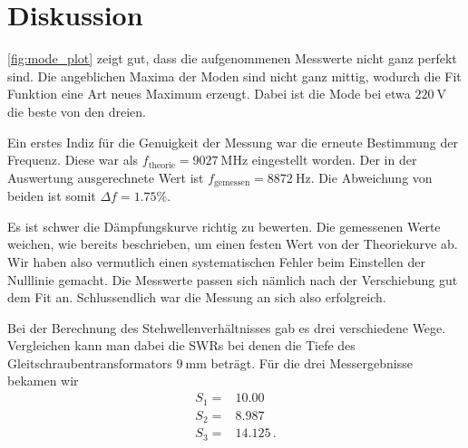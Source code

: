 \section{Diskussion}
\label{sec:Diskussion}

\autoref{fig:mode_plot} zeigt gut, dass die aufgenommenen Messwerte nicht ganz perfekt sind.
Die angeblichen Maxima der Moden sind nicht ganz mittig, wodurch die Fit Funktion eine Art neues Maximum erzeugt.
Dabei ist die Mode bei etwa $\SI{220}{\volt}$ die beste von den dreien.

Ein erstes Indiz für die Genuigkeit der Messung war die erneute Bestimmung der Frequenz.
Diese war als $f_\text{theorie} = \SI{9027}{\mega\hertz}$ eingestellt worden. 
Der in der Auswertung ausgerechnete Wert ist $f_\text{gemessen} = \SI{8872}{\hertz}$.
Die Abweichung von beiden ist somit $\Delta f = 1.75 \%$.

Es ist schwer die Dämpfungskurve richtig zu bewerten.
Die gemessenen Werte weichen, wie bereits beschrieben, um einen festen Wert von der Theoriekurve ab.
Wir haben also vermutlich einen systematischen Fehler beim Einstellen der Nulllinie gemacht.
Die Messwerte passen sich nämlich nach der Verschiebung gut dem Fit an.
Schlussendlich war die Messung an sich also erfolgreich.

Bei der Berechnung des Stehwellenverhältnisses gab es drei verschiedene Wege.
Vergleichen kann man dabei die SWRs bei denen die Tiefe des Gleitschraubentransformators $\SI{9}{\milli\meter}$ beträgt.
Für die drei Messergebnisse bekamen wir 
\begin{align}
    S_1 =& 10.00 \\
    S_2 =& 8.987 \\
    S_3 =& 14.125 \, .
\end{align}
